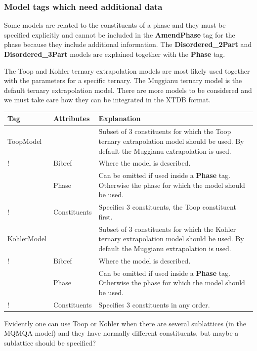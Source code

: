 \documentclass{article}
\begin{document}
\subsubsection{Model tags which need additional data}\label{sec:toop}

Some models are related to the constituents of a phase and they must
be specified explicitly and cannot be included in the {\bf AmendPhase}
tag for the phase because they include additional information.  The
{\bf Disordered\_2Part} and {\bf Disordered\_3Part} models are
explained together with the {\bf Phase} tag.

The Toop and Kohler ternary extrapolation models are most likely used
together with the parameters for a specific ternary.  The Muggianu
ternary model is the default ternary extrapolation model.  There are
more models to be considered and we must take care how they can be
integrated in the XTDB format.

\bigskip
\begin{tabular}{|p{} p{} p{}|}\hline
  Tag & Attributes & Explanation\\\hline

  ToopModel & & Subset of 3 constituents for which the Toop ternary extrapolation model should be used.    By default the Muggianu extrapolation is used.\\
!      & Bibref & Where the model is described.\\
      & Phase & Can be omitted if used inside a {\bf Phase} tag.  Otherwise the phase for which the model should be used.\\
!      & Constituents & Specifies 3 constituents, the Toop constituent first.\\\hline

  KohlerModel & & Subset of 3 constituents for which the Kohler ternary extrapolation model should be used.  By default the Muggianu extrapolation is used.\\
!      & Bibref & Where the model is described.\\
      & Phase & Can be omitted if used inside a {\bf Phase} tag.  Otherwise the phase for which the model should be used.\\
!      & Constituents & Specifies 3 constituents in any order.\\\hline

\end{tabular}

\bigskip
Evidently one can use Toop or Kohler when there are several
sublattices (in the MQMQA model) and they have normally different
constituents, but maybe a sublattice should be specified?
\end{document}
